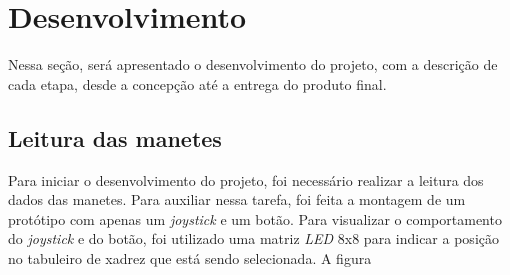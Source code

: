 \section[Desenvolvimento]{Desenvolvimento}
\label{cap:desenvolvimento}

Nessa seção, será apresentado o desenvolvimento do projeto, com a descrição de cada etapa, desde a concepção até a entrega do produto final.

\subsection[Leitura das manetes]{Leitura das manetes}

Para iniciar o desenvolvimento do projeto, foi necessário realizar a leitura dos dados das manetes.
Para auxiliar nessa tarefa, foi feita a montagem de um protótipo com apenas um \textit{joystick} e um botão.
Para visualizar o comportamento do \textit{joystick} e do botão, foi utilizado uma matriz \textit{LED} 8x8 para indicar a posição no tabuleiro de xadrez que está sendo selecionada.
A figura %